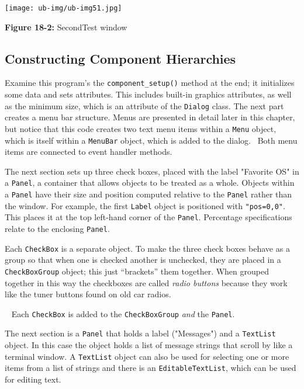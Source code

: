 \begin{center}
\texttt{[image: ub-img/ub-img51.jpg]}
\end{center}

{\sffamily\bfseries Figure 18-2:}
{\sffamily SecondTest window}

\bigskip

\subsection*{Constructing Component Hierarchies}

Examine this program's the \texttt{component\_setup()}
method at the end; it initializes some data and
sets attributes. This includes built-in graphics attributes,
as well as the minimum size, which is an attribute of the
\texttt{Dialog} class.
The next part creates a menu bar structure.
Menus are presented in detail later in this chapter, but notice
that this code creates two text menu items within a
\texttt{Menu} object, which is itself within a \texttt{MenuBar} object,
which is added to the dialog. \ Both menu items are connected to event
handler methods.

The next section sets up three check boxes,
placed with the label "Favorite OS" in a \texttt{Panel},
a container that allows objects to be treated
as a whole. Objects within a \texttt{Panel} have their size and
position computed relative
to the \texttt{Panel} rather than the window. For example, the
first \texttt{Label} object is positioned with
\texttt{"pos=0,0"}. This places it at the
top left-hand corner of the \texttt{Panel}.
Percentage specifications relate to the enclosing \texttt{Panel}.

Each \texttt{CheckBox} is a separate object. To make the three check
boxes behave as a group so that when one is checked
another is unchecked, they are placed in a
\texttt{CheckBoxGroup} object; this just
``brackets'' them together. When grouped
together in this way the checkboxes are called \textit{radio buttons} because they work like the
tuner buttons found on old car radios.

\medskip{}\ {\sffamily
Each \texttt{CheckBox} is added to the \texttt{CheckBoxGroup} \textit{and}
the \texttt{Panel}.}\medskip

The next section is a \texttt{Panel} that holds a label
("Messages") and a \texttt{TextList}
object. In this case the object holds a list of message
strings that scroll by like a terminal window. A \texttt{TextList}
object can also be used for selecting one or more items from a list of
strings and there is an \texttt{EditableTextList},
which can be used for editing text.

